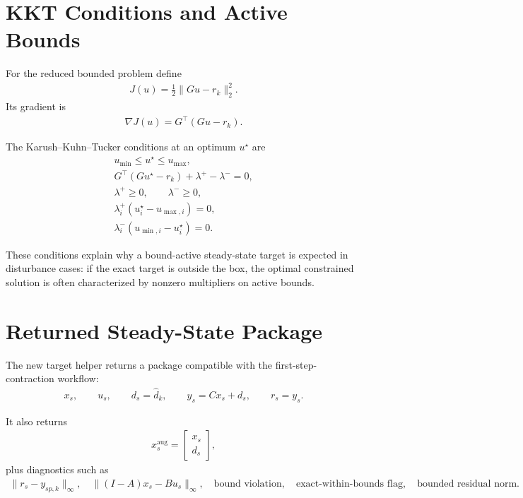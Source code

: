 \documentclass[11pt]{article}
\begin{document}
\section{KKT Conditions and Active Bounds}

For the reduced bounded problem define
\begin{align}
J(u) = \frac{1}{2}\|G u - r_k\|_2^2.
\end{align}
Its gradient is
\begin{align}
\nabla J(u) = G^\top(G u - r_k).
\end{align}

The Karush--Kuhn--Tucker conditions at an optimum $u^\star$ are
\begin{align}
u_{\min} \le u^\star \le u_{\max}, \\
G^\top(G u^\star - r_k) + \lambda^+ - \lambda^- = 0, \\
\lambda^+ \ge 0, \qquad \lambda^- \ge 0, \\
\lambda_i^+(u_i^\star - u_{\max,i}) = 0, \\
\lambda_i^-(u_{\min,i} - u_i^\star) = 0.
\end{align}

These conditions explain why a bound-active steady-state target is expected in disturbance cases: if the exact target is outside the box, the optimal constrained solution is often characterized by nonzero multipliers on active bounds.

\section{Returned Steady-State Package}

The new target helper returns a package compatible with the first-step-contraction workflow:
\begin{align}
x_s, \qquad
u_s, \qquad
d_s = \hat d_k, \qquad
y_s = Cx_s + d_s, \qquad
r_s = y_s.
\end{align}

It also returns
\begin{align}
x_s^{\mathrm{aug}} =
\begin{bmatrix}
x_s \\
d_s
\end{bmatrix},
\end{align}
plus diagnostics such as
\begin{align}
\|r_s-y_{sp,k}\|_\infty, \quad
\|(I-A)x_s-Bu_s\|_\infty, \quad
\text{bound violation}, \quad
\text{exact-within-bounds flag}, \quad
\text{bounded residual norm}.
\end{align}
\end{document}
